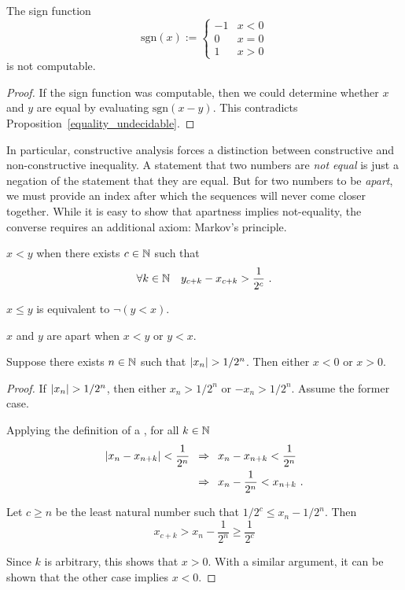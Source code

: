 \documentclass[leqno]{report}
\begin{document}
\begin{Corollary}
    The sign function
    \[
        \mathrm{sgn}(x) := \begin{cases}
            -1 & x < 0 \\
            0 & x = 0 \\
            1 & x > 0
        \end{cases}
    \]
    is not computable.
\end{Corollary}

\begin{proof}
    If the sign function was computable, then we could determine whether $x$ and $y$ are equal by evaluating $\mathrm{sgn}(x - y)$. This contradicts Proposition~\ref{equality_undecidable}.
\end{proof}

In particular, constructive analysis forces a distinction between constructive and non-constructive inequality. A statement that two numbers are \textit{not equal} is just a negation of the statement that they are equal. But for two numbers to be \textit{apart}, we must provide an index after which the sequences will never come closer together. While it is easy to show that apartness implies not-equality, the converse requires an additional axiom: Markov's principle.

\begin{Definition}[Ordering]
    $x < y$ when there exists $c \in \mathbb{N}$ such that
    \[ \forall {k \in \mathbb{N}} \quad {y_{c+k} - x_{c+k} > \frac{1}{2^c}} \ . \]

    $x \leq y$ is equivalent to $\neg (y < x)$.
\end{Definition}

\begin{Definition}[Apartness]
    $x$ and $y$ are apart when $x < y$ or $y < x$.
\end{Definition}

\begin{Lemma} \label{apartness}
    Suppose there exists $n \in \mathbb{N}$ such that $\left| x_n \right| > 1/2^n$.
    Then either $x < 0$ or $x > 0$.
\end{Lemma}

\begin{proof}
    If $\left| x_n \right| > 1/2^n$, then either $x_n > 1/2^n$ or $-x_n > 1/2^n$. Assume the former case.

    Applying the definition of a \FCCS, for all $k \in \mathbb{N}$
    \begin{align*}
        \left| x_n - x_{n+k} \right| < \frac{1}{2^n}
        \enspace&\Rightarrow\enspace x_n - x_{n+k} < \frac{1}{2^n} \\
        \enspace&\Rightarrow\enspace x_n - \frac{1}{2^n} < x_{n+k} \ .
    \end{align*}

    Let $c \geq n$ be the least natural number such that $1/2^c \leq x_n - 1/2^n$. Then
    \[ x_{c+k} > x_n - \frac{1}{2^n} \geq \frac{1}{2^c} \]

    Since $k$ is arbitrary, this shows that $x > 0$. With a similar argument, it can be shown that the other case implies $x < 0$.
\end{proof}
\end{document}
